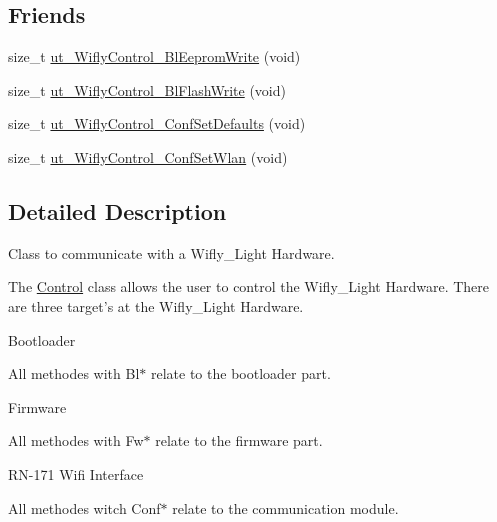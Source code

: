\subsection*{Friends}
\begin{DoxyCompactItemize}
\item 
size\-\_\-t \hyperlink{class_wy_light_1_1_control_a327c95f9335fa4b257b064ef2e917a80}{ut\-\_\-\-Wifly\-Control\-\_\-\-Bl\-Eeprom\-Write} (void)
\item 
size\-\_\-t \hyperlink{class_wy_light_1_1_control_a661b9ec8a685bc800221f2fd5d031a20}{ut\-\_\-\-Wifly\-Control\-\_\-\-Bl\-Flash\-Write} (void)
\item 
size\-\_\-t \hyperlink{class_wy_light_1_1_control_aeefa8ad693af2b134456faaf1586a2f7}{ut\-\_\-\-Wifly\-Control\-\_\-\-Conf\-Set\-Defaults} (void)
\item 
size\-\_\-t \hyperlink{class_wy_light_1_1_control_a04989feb17717c76d1dd95666aec3c93}{ut\-\_\-\-Wifly\-Control\-\_\-\-Conf\-Set\-Wlan} (void)
\end{DoxyCompactItemize}


\subsection{Detailed Description}
Class to communicate with a Wifly\-\_\-\-Light Hardware. 

The \hyperlink{class_wy_light_1_1_control}{Control} class allows the user to control the Wifly\-\_\-\-Light Hardware. There are three target's at the Wifly\-\_\-\-Light Hardware.
\begin{DoxyItemize}
\item Bootloader\par
 All methodes with Bl$\ast$ relate to the bootloader part.
\item Firmware\par
 All methodes with Fw$\ast$ relate to the firmware part.
\item R\-N-\/171 Wifi Interface\par
 All methodes witch Conf$\ast$ relate to the communication module. 
\end{DoxyItemize}

